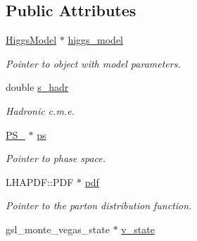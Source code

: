 \subsection*{Public Attributes}
\begin{DoxyCompactItemize}
\item 
\hypertarget{classintegrand__par_a9becf94ac239a82b946f53e36c75c83c}{}\hyperlink{classHiggsModel}{Higgs\+Model} $\ast$ \hyperlink{classintegrand__par_a9becf94ac239a82b946f53e36c75c83c}{higgs\+\_\+model}\label{classintegrand__par_a9becf94ac239a82b946f53e36c75c83c}

\begin{DoxyCompactList}\small\item\em Pointer to object with model parameters. \end{DoxyCompactList}\item 
\hypertarget{classintegrand__par_a02a52a8cc95edeadf423f181936617d0}{}double \hyperlink{classintegrand__par_a02a52a8cc95edeadf423f181936617d0}{s\+\_\+hadr}\label{classintegrand__par_a02a52a8cc95edeadf423f181936617d0}

\begin{DoxyCompactList}\small\item\em Hadronic c.\+m.\+e. \end{DoxyCompactList}\item 
\hypertarget{classintegrand__par_a9c52a4045c079f7314cbc8a876f98238}{}\hyperlink{classPS__2}{P\+S\+\_} $\ast$ \hyperlink{classintegrand__par_a9c52a4045c079f7314cbc8a876f98238}{ps}\label{classintegrand__par_a9c52a4045c079f7314cbc8a876f98238}

\begin{DoxyCompactList}\small\item\em Pointer to phase space. \end{DoxyCompactList}\item 
\hypertarget{classintegrand__par_a082dc10e0e72baedade3f46cfffa4c15}{}L\+H\+A\+P\+D\+F\+::\+P\+D\+F $\ast$ \hyperlink{classintegrand__par_a082dc10e0e72baedade3f46cfffa4c15}{pdf}\label{classintegrand__par_a082dc10e0e72baedade3f46cfffa4c15}

\begin{DoxyCompactList}\small\item\em Pointer to the parton distribution function. \end{DoxyCompactList}\item 
\hypertarget{classintegrand__par_a3b5e2c8a2f3c33f0ebc594fd8f42210e}{}gsl\+\_\+monte\+\_\+vegas\+\_\+state $\ast$ \hyperlink{classintegrand__par_a3b5e2c8a2f3c33f0ebc594fd8f42210e}{v\+\_\+state}\label{classintegrand__par_a3b5e2c8a2f3c33f0ebc594fd8f42210e}


\end{DoxyCompactItemize}
